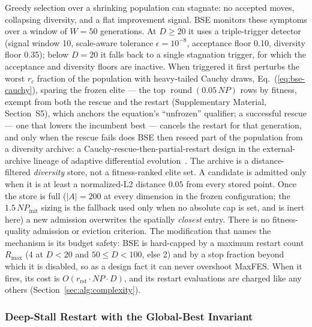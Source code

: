 Greedy selection over a shrinking population can stagnate: no
accepted moves, collapsing diversity, and a flat improvement signal.
BSE monitors these symptoms over a window of $W=50$ generations. At
$D\ge20$ it uses a triple-trigger detector (signal window 10,
scale-aware tolerance $\epsilon=10^{-8}$, acceptance floor 0.10,
diversity floor 0.35); below $D=20$ it falls back to a single
stagnation trigger, for which the acceptance and diversity floors are
inactive. When triggered it first perturbs the
worst $r_{c}$ fraction of the population with heavy-tailed
Cauchy draws, Eq.~(\ref{eq:bse-cauchy}), sparing the frozen elite ---
the top $\operatorname{round}(0.05\,NP)$ rows by fitness, exempt from
both the rescue and the restart (Supplementary Material, Section~S5),
which anchors the equation's ``unfrozen'' qualifier; a successful rescue --- one that
lowers the incumbent best --- cancels the restart for that generation, and
only when the rescue fails does BSE then reseed part of the population from
a diversity archive: a Cauchy-rescue-then-partial-restart design in the
external-archive lineage of adaptive differential
evolution~\cite{storn1997differential,zhang2009jade,tanabe2013shade}. %
The archive is a distance-filtered \emph{diversity} store, not a
fitness-ranked elite set. A candidate is admitted only when it is at
least a normalized-L2 distance $0.05$ from every stored point. Once
the store is full ($|A| = 200$ at every dimension in the frozen configuration; the $1.5\,NP_{\text{init}}$ sizing is the fallback used only when no absolute cap is set, and is inert here)
a new admission overwrites the spatially \emph{closest} entry. There is no
fitness-quality admission or eviction criterion. %
The modification that names the mechanism is its budget safety: BSE is
hard-capped by a maximum restart count $R_{\max}$ (4 at $D{<}20$ and
$50{\le}D{<}100$, else 2) and by a stop fraction beyond which it is disabled, so as a
design fact it can never overshoot
MaxFES. %
When it fires, its cost is $O(r_{\text{rst}}\cdot NP\cdot D)$, and its
restart evaluations are charged like any others
(Section~\ref{sec:alg:complexity}). %

\subsubsection{Deep-Stall Restart with the Global-Best Invariant}\label{sec:alg:deepstall}

